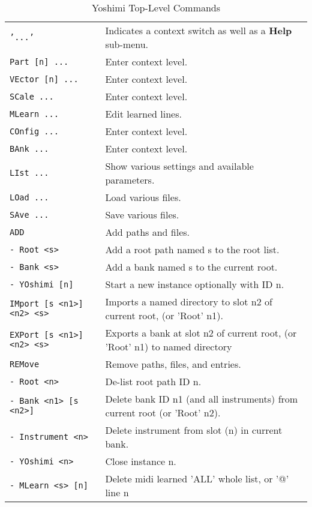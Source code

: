\begin{center}
\begin{longtable}{p{6cm} p{10cm}}
\caption[Yoshimi Top-Level Commands]{Yoshimi Top-Level Commands} \\
\texttt{'...'} &
   Indicates a context switch as well as a \textbf{Help} sub-menu. \\
\texttt{Part [n] ...} &
   Enter context level. \\
\texttt{VEctor [n] ...} &
   Enter context level. \\
\texttt{SCale ...} &
   Enter context level. \\
\texttt{MLearn ...} &
   Edit learned lines. \\
\texttt{COnfig ...} &
   Enter context level. \\
\texttt{BAnk ...} &
   Enter context level. \\
\texttt{LIst ...} &
   Show various settings and available parameters. \\
\texttt{LOad ...} &
   Load various files. \\
\texttt{SAve ...} &
   Save various files. \\
\texttt{ADD} &
   Add paths and files. \\
\texttt{- Root <s>} &
   Add a root path named s to the root list. \\
\texttt{- Bank <s>} &
   Add a bank named s to the current root. \\
\texttt{- YOshimi [n]} &
   Start a new instance optionally with ID n. \\
\texttt{IMport [s <n1>] <n2> <s>} &
   Imports a named directory to slot n2 of current root, (or 'Root' n1). \\
\texttt{EXPort [s <n1>] <n2> <s>} &
   Exports a bank at slot n2 of current root, (or 'Root' n1) to named
   directory
 \\
\texttt{REMove} &
   Remove paths, files, and entries. \\
\texttt{- Root <n>} &
   De-list root path ID n. \\
\texttt{- Bank <n1> [s <n2>]} &
   Delete bank ID n1 (and all instruments) from current root
   (or 'Root' n2). \\
\texttt{- Instrument <n>} &
   Delete instrument from slot (n) in current bank. \\
\texttt{- YOshimi <n>} &
   Close instance n. \\
\texttt{- MLearn <s> [n]} &
   Delete midi learned 'ALL' whole list, or '@' line n \\


\end{longtable}
\end{center}
